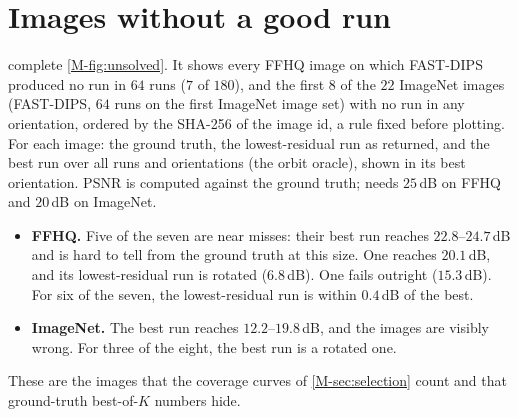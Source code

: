 \section{Images without a good run}
\label{sec:suppl-unsolved}
 complete \cref{M-fig:unsolved}. It shows every FFHQ image on which FAST-DIPS produced no \good run in $64$ runs ($7$ of $180$), and the first $8$ of the $22$ ImageNet images (FAST-DIPS, $64$ runs on the first ImageNet image set) with no \good run in any orientation, ordered by the SHA-256 of the image id, a rule fixed before plotting.
For each image: the ground truth, the lowest-residual run as returned, and the best run over all runs and orientations (the orbit oracle), shown in its best orientation.
PSNR is computed against the ground truth; \good needs $25$\,dB on FFHQ and $20$\,dB on ImageNet.
\begin{itemize}[leftmargin=*,itemsep=1pt,topsep=2pt]
\item \textbf{FFHQ.} Five of the seven are near misses: their best run reaches $22.8$--$24.7$\,dB and is hard to tell from the ground truth at this size. One reaches $20.1$\,dB, and its lowest-residual run is rotated ($6.8$\,dB). One fails outright ($15.3$\,dB). For six of the seven, the lowest-residual run is within $0.4$\,dB of the best.
\item \textbf{ImageNet.} The best run reaches $12.2$--$19.8$\,dB, and the images are visibly wrong. For three of the eight, the best run is a rotated one.
\end{itemize}
These are the images that the coverage curves of \cref{M-sec:selection} count and that ground-truth best-of-$K$ numbers hide.

